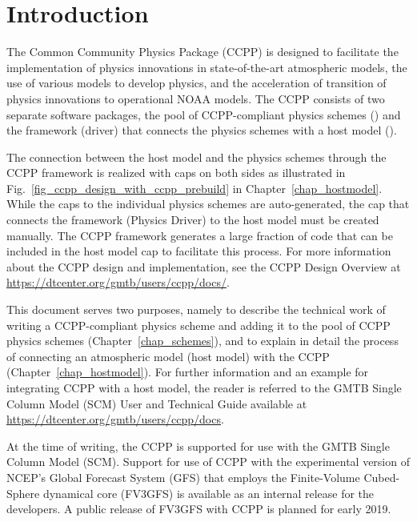 \chapter{Introduction}\label{chap_introduction}
\setlength{\parskip}{12pt}

The Common Community Physics Package (CCPP) is designed to facilitate the implementation of physics innovations in state-of-the-art atmospheric models, the use of various models to develop physics, and the acceleration of transition of physics innovations to operational NOAA models. The CCPP consists of two separate software packages, the pool of CCPP-compliant physics schemes () and the framework (driver) that connects the physics schemes with a host model ().

The connection between the host model and the physics schemes through the CCPP framework is realized with caps on both sides as illustrated in Fig.~\ref{fig_ccpp_design_with_ccpp_prebuild} in Chapter~\ref{chap_hostmodel}. While the caps to the individual physics schemes are auto-generated, the cap that connects the framework (Physics Driver) to the host model must be created manually. The CCPP framework generates a large fraction of code that can be included in the host model cap to facilitate this process. For more information about the CCPP design and implementation, see the CCPP Design Overview at {\url{https://dtcenter.org/gmtb/users/ccpp/docs/}}.

This document serves two purposes, namely to describe the technical work of writing a CCPP-compliant physics scheme and adding it to the pool of CCPP physics schemes (Chapter~\ref{chap_schemes}), and to explain in detail the process of connecting an atmospheric model (host model) with the CCPP (Chapter~\ref{chap_hostmodel}). For further information and an example for integrating CCPP with a host model, the reader is referred to the GMTB Single Column Model (SCM) User and Technical Guide  available at {\url{https://dtcenter.org/gmtb/users/ccpp/docs}}.

At the time of writing, the CCPP is supported for use with the GMTB Single Column Model (SCM). Support for use of CCPP with the experimental version of NCEP's Global Forecast System (GFS) that employs the Finite-Volume Cubed-Sphere dynamical core (FV3GFS) is available as an internal release for the developers. A public release of FV3GFS with CCPP is planned for early 2019.

